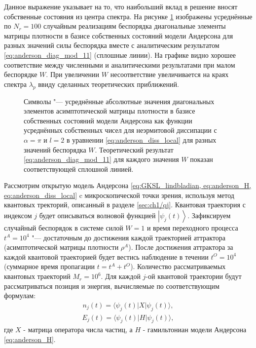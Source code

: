 Данное выражение указывает на то, что наибольший вклад в решение вносят собственные состояния из центра спектра.
На рисунке \cref{fig:anderson_rho_nn_2} изображены усреднённые по \(N_r=100\) случайным реализациям беспорядка диагональные элементы матрицы плотности в базисе собственных состояний модели Андерсона для разных значений силы беспорядка вместе с аналитическим результатом \cref {eq:anderson_diag_mod_11} (сплошные линии). На графике видно хорошее соответствие между численными и аналитическими результатами при малом беспорядке \(W\). При увеличении \(W\) несоответствие увеличивается на краях спектра \(\lambda_p\) ввиду сделанных теоретических приближений. 
\begin{figure}[ht]
	\caption[Усреднённые диагональные элементы матрицы плотности c преобладанием делокализованных Андерсоновских мод и теоретической оценкой]{
		Символы "--- усреднённые абсолютные значения диагональных элементов асимптотической матрицы плотности в базисе собственных состояний модели Андерсона как функции усреднённых собственных чисел для неэрмитовой диссипации  с \(\alpha=\pi\) и \(l=2\) в уравнении \cref{eq:anderson_diss_local} для разных значений беспорядка \(W\). Теоретический результат \cref{eq:anderson_diag_mod_11} для каждого значения \(W\) показан соответствующей сплошной линией.
	}
	\label{fig:anderson_rho_nn_2}
\end{figure}

Рассмотрим открытую модель Андерсона \cref{eq:GKSL_lindbladian, eq:anderson_H, eq:anderson_diss_local} c микроскопической точки зрения, используя метод квантовых тректорий, описанный в разделе \cref{sec:ch1/qj}. Квантовая траектория с индексом \(j\) будет описываться волновой функцией \(\left| \psi_j(t) \right\rangle\). Зафиксируем случайный беспорядок в системе силой \(W=1\) и время переходного процесса \(t^A = 10^4\) "--- достаточным до достижения каждой траекторией аттрактора (асимптотической матрицы плотности \(\rho^A\)). После достижения аттрактора за каждой квантовой траекторией будет вестись наблюдение в течении \(t^O = 10^4\) (суммарное время пропагации \(t = t^A + t^O\)). Количество рассматриваемых квантовых траекторий \(M_r=10^6\). Для каждой \(j\)-ой квантовой траектории будут рассматриваться позиция и энергия, вычисляемые по соответствующим формулам:
\begin{equation}
	\label{eq:anderson_position}
	\begin{gathered}
		n_j(t) = \langle \psi_j(t)| X | \psi_j(t) \rangle,
	\end{gathered}
\end{equation}
\begin{equation}
	\label{eq:anderson_energy}
	\begin{gathered}
		E_j(t) = \langle \psi_j(t)| H | \psi_j(t) \rangle,
	\end{gathered}
\end{equation}
где \(X\) - матрица оператора числа частиц, а \(H\) - гамильтониан модели Андерсона \cref{eq:anderson_H}.

